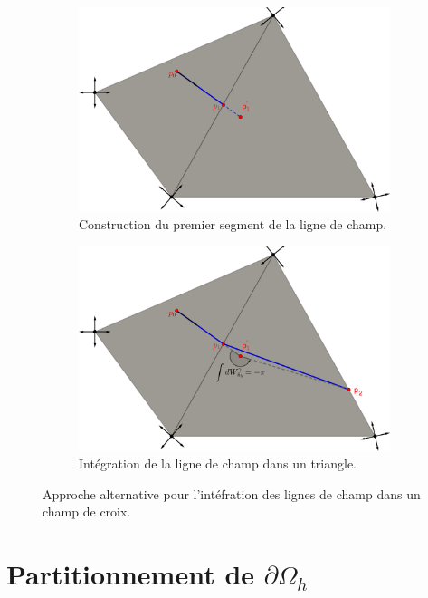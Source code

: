 \begin{figure}[!h]
     \centering
     \begin{subfigure}[b]{0.7\textwidth}
         \centering
         \includegraphics[width=\textwidth]{images/draw_streams_21.pdf}
         \caption{Construction du premier segment de la ligne de champ.}
     \end{subfigure}
     \begin{subfigure}[b]{0.7\textwidth}
         \centering
         \includegraphics[width=\textwidth]{images/draw_streams_22.pdf}
         \caption{Intégration de la ligne de champ dans un triangle.}
     \end{subfigure}
        \caption{Approche alternative pour l'intéfration des lignes de champ dans un champ de croix.}
        \label{fig:draw_streams_2}
\end{figure}

\section{Partitionnement de $\partial\Omega_h$}
\label{sec:partitionnement_omega_h}

